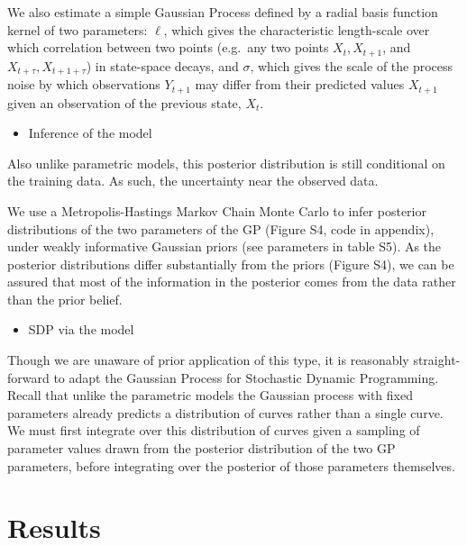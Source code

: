 \documentclass[author-year, review]{elsarticle} %
\begin{document}
We also estimate a simple Gaussian Process defined by a radial basis
function kernel of two parameters: $\ell$, which gives the
characteristic length-scale over which correlation between two points
(e.g.~any two points $X_t, X_{t+1}$, and $X_{t+\tau}, X_{t+1+\tau}$) in
state-space decays, and $\sigma$, which gives the scale of the process
noise by which observations $Y_{t+1}$ may differ from their predicted
values $X_{t+1}$ given an observation of the previous state, $X_t$.

\begin{itemize}
\itemsep1pt\parskip0pt
\item
  Inference of the model
\end{itemize}

Also unlike parametric models, this posterior distribution is still
conditional on the training data. As such, the uncertainty near the
observed data.

We use a Metropolis-Hastings Markov Chain Monte Carlo to infer posterior
distributions of the two parameters of the GP (Figure S4, code in
appendix), under weakly informative Gaussian priors (see parameters in
table S5). As the posterior distributions differ substantially from the
priors (Figure S4), we can be assured that most of the information in
the posterior comes from the data rather than the prior belief.

\begin{itemize}
\itemsep1pt\parskip0pt
\item
  SDP via the model
\end{itemize}

Though we are unaware of prior application of this type, it is
reasonably straight-forward to adapt the Gaussian Process for Stochastic
Dynamic Programming. Recall that unlike the parametric models the
Gaussian process with fixed parameters already predicts a distribution
of curves rather than a single curve. We must first integrate over this
distribution of curves given a sampling of parameter values drawn from
the posterior distribution of the two GP parameters, before integrating
over the posterior of those parameters themselves.

\section{Results}\label{results}
\end{document}
